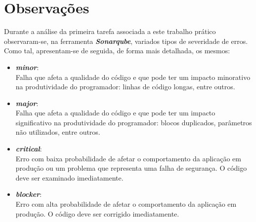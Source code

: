\documentclass[a4paper]{report}
\begin{document}
\chapter{Observações}
Durante a análise da primeira tarefa associada a este trabalho prático observaram-se, na ferramenta \textit{\textbf{Sonarqube}}, variados tipos de severidade de erros. Como tal, apresentam-se de seguida, de forma mais detalhada, os mesmos:
\begin{itemize}
    \item \textbf{\textit{minor}}:
    \\ Falha que afeta a qualidade do código e que pode ter um impacto minorativo na produtividade do programador: linhas de código longas, entre outros.
    \item \textbf{\textit{major}}:
    \\ Falha que afeta a qualidade do código e que pode ter um impacto significativo na produtividade do programador: blocos duplicados, parâmetros não utilizados, entre outros.
    \item \textbf{\textit{critical}}:
    \\ Erro com baixa probabilidade de afetar o comportamento da aplicação em produção ou um problema que representa uma falha de segurança. O código deve ser examinado imediatamente.
    \item \textbf{\textit{blocker}}:
    \\ Erro com alta probabilidade de afetar o comportamento da aplicação em produção. O código deve ser corrigido imediatamente.
\end{itemize}
\end{document}
